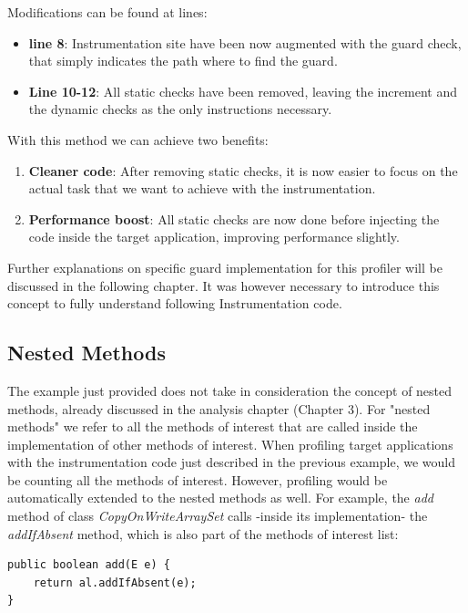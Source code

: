 \documentclass[]{usiinfthesis}
\begin{document}
\vspace*{0.5cm}

\noindent
Modifications can be found at lines:
\begin{itemize}
    \item \textbf{line 8}: Instrumentation site have been now augmented with the guard check, that simply indicates the path where to find the guard.
    
    \item \textbf{Line 10-12}: All static checks have been removed, leaving the increment and the dynamic checks as the only instructions necessary.
\end{itemize}

\noindent
With this method we can achieve two benefits:
\begin{enumerate}
    \item \textbf{Cleaner code}: After removing static checks, it is now easier to focus on the actual task that we want to achieve with the instrumentation.
    
    \item \textbf{Performance boost}: All static checks are now done before injecting the code inside the target application, improving performance slightly.
\end{enumerate}

\noindent
Further explanations on specific guard implementation for this profiler will be discussed in the following chapter. It was however necessary to introduce this concept to fully understand following Instrumentation code.

\subsection{Nested Methods}
The example just provided does not take in consideration the concept of nested methods, already discussed in the analysis chapter (Chapter 3). For "nested methods" we refer to all the methods of interest that are called inside the implementation of other methods of interest. When profiling target applications with the instrumentation code just described in the previous example, we would be counting all the methods of interest. However, profiling would be automatically extended to the nested methods as well. For example, the \textit{add} method of class \textit{CopyOnWriteArraySet} calls -inside its implementation- the \textit{addIfAbsent} method, which is also part of the methods of interest list:

\begin{verbatim}
public boolean add(E e) {
    return al.addIfAbsent(e);
}
\end{verbatim}
\end{document}
